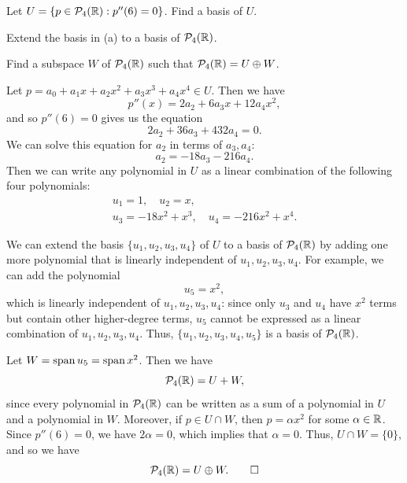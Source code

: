\begin{exc}
\begin{exercise}\leavevmode
\begin{parts}
\item Let $U=\{p\in\mathcal{P}_4(\mathbb{R}) : p''(6)=0\}$. Find a basis of $U$.
\item Extend the basis in (a) to a basis of $\mathcal{P}_4(\mathbb{R})$.
\item Find a subspace $W$ of $\mathcal{P}_4(\mathbb{R})$ such that $\mathcal{P}_4(\mathbb{R})=U\oplus W$.
\end{parts}
\end{exercise}
\begin{solution}
\begin{parts}
\item Let $p=a_0+a_1x+a_2x^2+a_3x^3+a_4x^4\in U$. Then we have
  \[ p''(x) = 2a_2+6a_3x+12a_4x^2, \]
  and so $p''(6)=0$ gives us the equation
  \[ 2a_2+36a_3+432a_4 = 0. \]
  We can solve this equation for $a_2$ in terms of $a_3,a_4$:
  \[ a_2 = -18a_3-216a_4. \]
  Then we can write any polynomial in $U$ as a linear combination of the
  following four polynomials:
  \begin{gather*}
  u_1=1, \quad u_2=x,\\
  u_3=-18x^2+x^3, \quad u_4=-216x^2+x^4.
  \end{gather*}
\item We can extend the basis $\{u_1,u_2,u_3,u_4\}$ of $U$ to a basis of
  $\mathcal{P}_4(\mathbb{R})$ by adding one more polynomial that is linearly independent of
  $u_1,u_2,u_3,u_4$. For example, we can add the polynomial
  \[ u_5 = x^2, \]
  which is linearly independent of $u_1,u_2,u_3,u_4$: since only $u_3$ and
  $u_4$ have $x^2$ terms but contain other higher-degree terms, $u_5$ cannot be
  expressed as a linear combination of $u_1,u_2,u_3,u_4$. Thus,
  $\{u_1,u_2,u_3,u_4,u_5\}$ is a basis of $\mathcal{P}_4(\mathbb{R})$.
\item Let $W=\operatorname{span} u_5=\operatorname{span} x^2$. Then we have
  \[ \mathcal{P}_4(\mathbb{R}) = U+W, \]
  since every polynomial in $\mathcal{P}_4(\mathbb{R})$ can be written as a sum of a
  polynomial in $U$ and a polynomial in $W$. Moreover, if $p\in U\cap W$, then
  $p=\alpha x^2$ for some $\alpha\in\mathbb{R}$. Since $p''(6)=0$, we have $2\alpha=0$,
  which implies that $\alpha=0$. Thus, $U\cap W=\{0\}$, and so we have
  \[ \mathcal{P}_4(\mathbb{R}) = U\oplus W. \qedhere \]
\end{parts}
\end{solution}


\end{exc}
